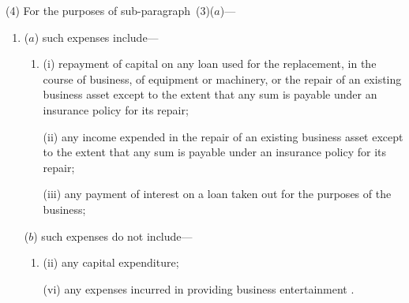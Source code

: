 \documentclass[12pt,a4paper]{article}
\begin{document}
(4) For the purposes of sub-paragraph~(3)($a$)—
\begin{enumerate}\item[]
($a$) such expenses include—
\begin{enumerate}\item[]
(i) repayment of capital on any loan used for the replacement, in the course of business, of equipment or machinery, or the repair of an existing business asset except to the extent that any sum is payable under an insurance policy for its repair;

(ii) any income expended in the repair of an existing business asset except to the extent that any sum is payable under an insurance policy for its repair;

(iii) any payment of interest on a loan taken out for the purposes of the business;
\end{enumerate}

($b$) such expenses do not include—
\begin{enumerate}\item[]

(ii) any capital expenditure;




(vi) any expenses incurred in providing business entertainment%
%
.
\end{enumerate}
\end{enumerate}

\end{document}
